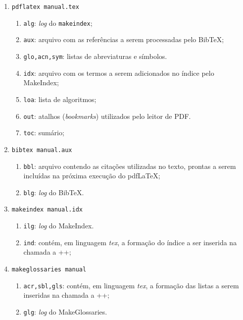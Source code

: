 \documentclass{fei}
\begin{document}
	\begin{enumerate}
	
	\item\verb+pdflatex manual.tex+
	\begin{enumerate}
	\item \texttt{alg}: \emph{log} do \texttt{makeindex};
	\item \texttt{aux}: arquivo com as referências a serem processadas pelo Bib\TeX;
	\item \texttt{glo,acn,sym}: listas de abreviaturas e símbolos.
	\item \texttt{idx}: arquivo com os termos a serem adicionados no índice pelo MakeIndex;	
	\item \texttt{loa}: lista de algoritmos;
	\item \texttt{out}: atalhos (\emph{bookmarks}) utilizados pelo leitor de PDF.
	\item \texttt{toc}: sumário;
	\end{enumerate}	
	
	\item\verb+bibtex manual.aux+
	\begin{enumerate}
	\item \texttt{bbl}: arquivo contendo as citações utilizadas no texto, prontas a serem incluídas na próxima execução do pdf\LaTeX;
	\item \texttt{blg}: \emph{log} do Bib\TeX.
	\end{enumerate}	
	
	\item\verb+makeindex manual.idx+
	\begin{enumerate}
	\item \texttt{ilg}: \emph{log} do MakeIndex.
	\item \texttt{ind}: contém, em linguagem \emph{tex}, a formação do índice a ser inserida na chamada a \latexinline+\printindex+;
	\end{enumerate}	
	
	\item\verb+makeglossaries manual+
	\begin{enumerate}
	\item \texttt{acr,sbl,gls}:  contém, em linguagem \emph{tex}, a formação das listas a serem inseridas na chamada a \latexinline+\printglossaries+;
	\item \texttt{glg}: \emph{log} do MakeGlossaries.
	\end{enumerate}
	\end{enumerate}
	
	\indice
	
\end{document}
